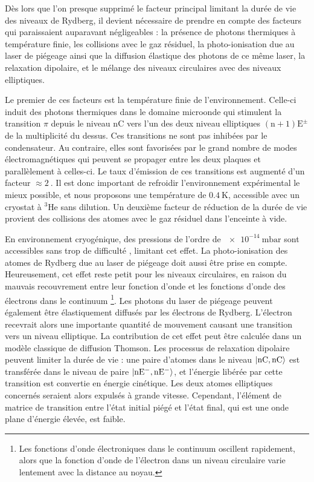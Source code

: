 Dès lors que l'on presque supprimé le facteur principal limitant la durée de vie des niveaux de Rydberg, il devient nécessaire de prendre en compte des facteurs qui paraissaient auparavant négligeables :
la présence de photons thermiques à température finie, les collisions avec le gaz résiduel,  la photo-ionisation due au laser de piégeage ainsi que la diffusion élastique des photons de ce même laser, la relaxation dipolaire, et le mélange des niveaux circulaires avec des niveaux elliptiques.

Le premier de ces facteurs est la température finie de l'environnement.
Celle-ci induit des photons thermiques dans le domaine microonde qui stimulent la transition $\pi$ depuis le niveau $\mathrm{nC}$ vers l'un des deux niveau elliptiques $\mathrm{(n+1)E^\pm}$ de la multiplicité du dessus.
Ces transitions ne sont pas inhibées par le condensateur.
Au contraire, elles sont favorisées par le grand nombre de modes électromagnétiques qui peuvent se propager entre les deux plaques et parallèlement à celles-ci.
Le taux d'émission de ces transitions est augmenté d'un facteur $\approx \SI{2}{}$.
Il est donc important de refroidir l'environnement expérimental le mieux possible, et nous proposons une température de $\SI{0.4}{\K}$, accessible avec un cryostat à $^3$He sans dilution.
Un deuxième facteur de réduction de la durée de vie provient des collisions des atomes avec le gaz résiduel dans l'enceinte à vide.

En environnement cryogénique, des pressions de l'ordre de $\SI{e-14}{\milli\bar}$ sont accessibles sans trop de difficulté \cite{MX_GABRIELSEANTIPROTON90,MX_WERTHCRYOION98}, limitant cet effet.
La photo-ionisation des atomes de Rydberg due au laser de piégeage doit aussi être prise en compte.
Heureusement, cet effet reste petit pour les niveaux circulaires, en raison du mauvais recouvrement entre leur fonction d'onde et les fonctions d'onde des électrons dans le continuum
\footnote{Les fonctions d'onde électroniques dans le continuum oscillent rapidement, alors que la fonction d'onde de l'électron dans un niveau circulaire varie lentement avec la distance au noyau.}.
Les photons du laser de piégeage peuvent également être élastiquement diffusés par les électrons de Rydberg. L'électron recevrait alors une importante quantité de mouvement causant une transition vers un niveau elliptique.
La contribution de cet effet peut être calculée dans un modèle classique de diffusion Thomson.
Les processus de relaxation dipolaire peuvent limiter la durée de vie : une paire d'atomes dans le niveau $\ket{\mathrm{nC,nC}}$ est transférée dans le niveau de paire $\ket{\mathrm{nE^- , nE^-}}$, et l'énergie libérée par cette transition est convertie en énergie cinétique. Les deux atomes elliptiques concernés seraient alors expulsés à grande vitesse.
Cependant, l'élément de matrice de transition entre l'état initial piégé et l'état final, qui est une onde plane d'énergie élevée, est faible.

